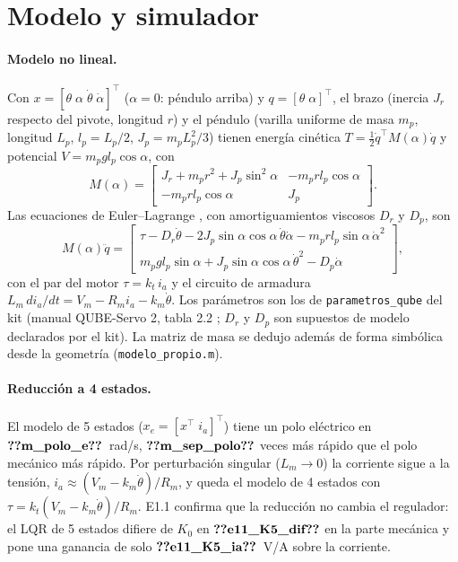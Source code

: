 \documentclass[11pt,a4paper]{article}
\begin{document}
\section{Modelo y simulador}
\paragraph{Modelo no lineal.} Con $x=[\theta\;\alpha\;\dot\theta\;\dot\alpha]^\top$ ($\alpha=0$: péndulo arriba) y
$q=[\theta\;\alpha]^\top$, el brazo (inercia $J_r$ respecto del pivote, longitud $r$) y el péndulo (varilla uniforme de
masa $m_p$, longitud $L_p$, $l_p=L_p/2$, $J_p=m_pL_p^2/3$) tienen energía cinética
$T=\tfrac12\dot q^\top M(\alpha)\dot q$ y potencial $V=m_pgl_p\cos\alpha$, con
\begin{equation}
M(\alpha)=\begin{bmatrix}J_r+m_pr^2+J_p\sin^2\alpha & -m_prl_p\cos\alpha\\ -m_prl_p\cos\alpha & J_p\end{bmatrix}.
\end{equation}
Las ecuaciones de Euler--Lagrange \cite{cazzolato2011}, con amortiguamientos viscosos $D_r$ y $D_p$, son
\begin{equation}
M(\alpha)\ddot q=\begin{bmatrix}\tau-D_r\dot\theta-2J_p\sin\alpha\cos\alpha\,\dot\theta\dot\alpha-m_prl_p\sin\alpha\,\dot\alpha^2\\
m_pgl_p\sin\alpha+J_p\sin\alpha\cos\alpha\,\dot\theta^2-D_p\dot\alpha\end{bmatrix},
\end{equation}
con el par del motor $\tau=k_t\,i_a$ y el circuito de armadura $L_m\,di_a/dt=V_m-R_mi_a-k_m\dot\theta$.
Los parámetros son los de \texttt{parametros\_qube} del kit (manual QUBE-Servo 2, tabla 2.2 \cite{quanser2016};
$D_r$ y $D_p$ son supuestos de modelo declarados por el kit). La matriz de masa se dedujo además de forma
simbólica desde la geometría (\texttt{modelo\_propio.m}).

\paragraph{Reducción a 4 estados.} El modelo de 5 estados ($x_e=[x^\top\;i_a]^\top$) tiene un polo eléctrico en
$\V{m_polo_e}$~rad/s, $\V{m_sep_polo}$ veces más rápido que el polo mecánico más rápido. Por perturbación singular
($L_m\to0$) la corriente sigue a la tensión, $i_a\approx(V_m-k_m\dot\theta)/R_m$, y queda el modelo de 4 estados con
$\tau=k_t(V_m-k_m\dot\theta)/R_m$. E1.1 confirma que la reducción no cambia el regulador: el LQR de 5 estados difiere
de $K_0$ en $\V{e11_K5_dif}$ en la parte mecánica y pone una ganancia de solo $\V{e11_K5_ia}$~V/A sobre la corriente.
\end{document}
